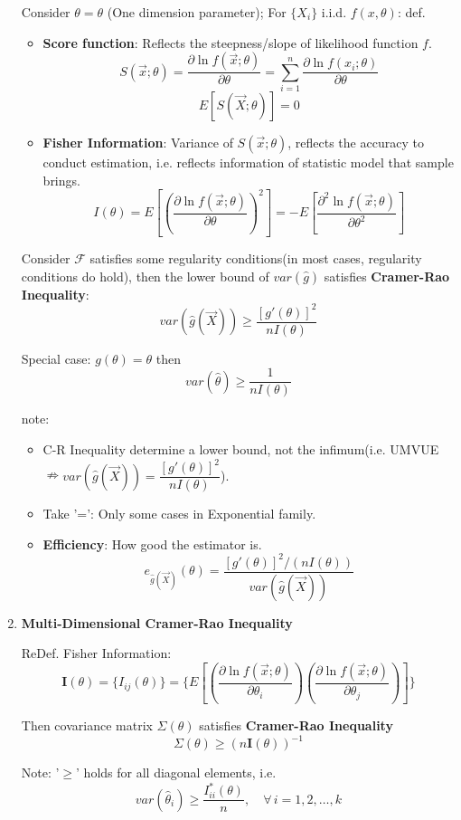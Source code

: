 \begin{enumerate}
    Consider $\theta=\theta$ (One dimension parameter); For $\{X_i\}$ i.i.d. $f(x,\theta)$: def.
    \begin{itemize}
        \item \textbf{Score function}: Reflects the steepness/slope of likelihood function $f$.
        \[
            S(\vec{x};\theta)=\frac{\partial\ln f(\vec{x};\theta)}{\partial\theta}=\sum_{i=1}^n\frac{\partial\ln f(x_i;\theta)}{\partial\theta}
        \]
        \[E[S(\vec{X};\theta)]=0\]
        \item \textbf{Fisher Information}: Variance of $S(\vec{x};\theta)$, reflects the accuracy to conduct estimation, i.e. reflects information of statistic model that sample brings.
        \[
            I(\theta)=E\left[\left(\frac{\partial \ln f(\vec{x};\theta)}{\partial\theta}\right)^2\right]=-E\left[\frac{\partial^2\ln f(\vec{x};\theta)}{\partial \theta^2}\right]
        \]
    \end{itemize}

    Consider $\mathscr{F}$ satisfies some regularity conditions(in most cases, regularity conditions do  hold), then the lower bound of $var(\hat{g})$ satisfies \textbf{Cramer-Rao Inequality}:
    \[
        var(\hat{g}(\vec{X}))\geq\frac{[g'(\theta)]^2}{nI(\theta)}
    \]

    Special case: $g(\theta)=\theta$ then
    \[
        var(\hat{\theta})\geq\frac{1}{nI(\theta)}    
    \]

    note:
    \begin{itemize}
        \item C-R Inequality determine a lower bound, not the infimum(i.e. UMVUE$\nRightarrow var(\hat{g}(\vec{X}))=\dfrac{[g'(\theta)]^2}{nI(\theta)}$).
        \item Take '=': Only some cases in Exponential family.
        \item \textbf{Efficiency}: How good the estimator is.
        \[
            e_{\hat{g}(\vec{X})}(\theta)=   \frac{[g'(\theta)]^2/(nI(\theta))}{var(\hat{g}(\vec{X}))} 
        \] 
    \end{itemize}


\item \textbf{Multi-Dimensional Cramer-Rao Inequality}

    ReDef. Fisher Information:
    \[
        \mathbf{I}(\theta)=\{I_{ij}(\theta)\}=\{E\left[\left(\frac{\partial\ln f(\vec{x};\theta)}{\partial\theta_i}\right)\left(\frac{\partial\ln f(\vec{x};\theta)}{\partial\theta_j}\right)\right]\}  
    \]

    Then covariance matrix $\Sigma(\theta)$ satisfies \textbf{Cramer-Rao Inequality}
    \[
        \Sigma(\theta)\geq (n\mathbf{I}(\theta))^{-1}
    \]

    Note: '$\geq$' holds for all diagonal elements, i.e.
\[
    var(\hat{\theta}_i)\geq \frac{I^*_{ii}(\theta)}{n},\quad \forall\,i=1,2,\ldots,k  
\]


    
\end{enumerate}







